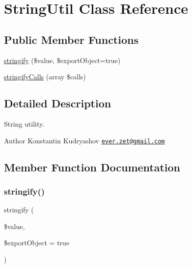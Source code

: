 \hypertarget{class_prophecy_1_1_util_1_1_string_util}{}\section{String\+Util Class Reference}
\label{class_prophecy_1_1_util_1_1_string_util}
\subsection*{Public Member Functions}
\begin{DoxyCompactItemize}
\item 
\mbox{\hyperlink{class_prophecy_1_1_util_1_1_string_util_aefee44fc011f2dd012c0ac73c9a911e6}{stringify}} (\$value, \$export\+Object=true)
\item 
\mbox{\hyperlink{class_prophecy_1_1_util_1_1_string_util_a00cc89739aad78a1ca1a268c1e8c88b1}{stringify\+Calls}} (array \$calls)
\end{DoxyCompactItemize}


\subsection{Detailed Description}
String utility.

\begin{DoxyAuthor}{Author}
Konstantin Kudryashov \href{mailto:ever.zet@gmail.com}{\tt ever.\+zet@gmail.\+com} 
\end{DoxyAuthor}


\subsection{Member Function Documentation}
\mbox{\label{class_prophecy_1_1_util_1_1_string_util_aefee44fc011f2dd012c0ac73c9a911e6}} 
\subsubsection{\texorpdfstring{stringify()}{stringify()}}
{\footnotesize\ttfamily stringify (\begin{DoxyParamCaption}\item[{}]{\$value,  }\item[{}]{\$export\+Object = {\ttfamily true} }\end{DoxyParamCaption})}

